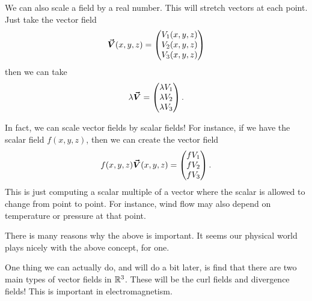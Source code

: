         We can also scale a field by a real number.  This will stretch vectors at each point.  Just take the vector field
        \[
        \boldsymbol{\vec{V}}(x,y,z)=\begin{pmatrix} V_1(x,y,z) \\ V_2(x,y,z) \\ V_3(x,y,z)\end{pmatrix}
        \]
        then we can take
        \[
        \lambda \boldsymbol{\vec{V}}=\begin{pmatrix} \lambda V_1\\ \lambda V_2\\ \lambda V_3\end{pmatrix}.
        \]
        
        In fact, we can scale vector fields by scalar fields! For instance, if we have the scalar field $f(x,y,z)$, then we can create the vector field
        \[
        f(x,y,z) \boldsymbol{\vec{V}}(x,y,z) = \begin{pmatrix} fV_1 \\ fV_2 \\ fV_3 \end{pmatrix}.
        \]
       This is just computing a scalar multiple of a vector where the scalar is allowed to change from point to point.  For instance, wind flow may also depend on temperature or pressure at that point.
        
        \begin{remark}
        There is many reasons why the above is important.  It seems our physical world plays nicely with the above concept, for one.
        
        One thing we can actually do, and will do a bit later, is find that there are two main types of vector fields in $\mathbb{R}^3$.  These will be the curl fields and divergence fields!  This is important in electromagnetism.
        \end{remark}		        
		        

		        
                      